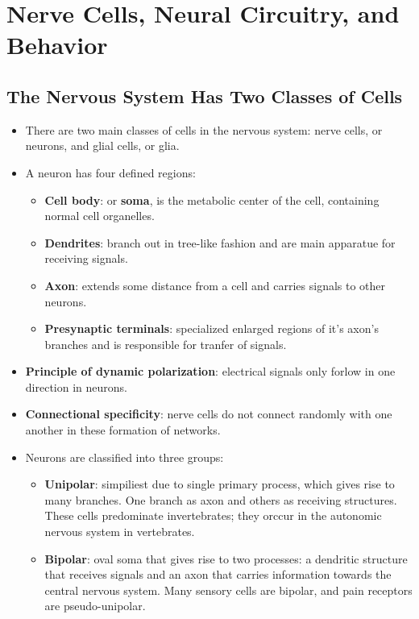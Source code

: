 \documentclass[12pt,a4paper]{article}
\begin{document}
\clearpage
\section{Nerve Cells, Neural Circuitry, and Behavior}
\subsection{The Nervous System Has Two Classes of Cells}
\begin{itemize}
    \item There are two main classes of cells in the nervous system: nerve cells, or neurons, and glial cells, or glia.
    \item A neuron has four defined regions:
        \begin{itemize}
            \item \textbf{Cell body}: or \textbf{soma}, is the metabolic center of the cell, containing normal cell organelles.
            \item \textbf{Dendrites}: branch out in tree-like fashion and are main apparatue for receiving signals.
            \item \textbf{Axon}: extends some distance from a cell and carries signals to other neurons.
            \item \textbf{Presynaptic terminals}: specialized enlarged regions of it's axon's branches and is responsible for tranfer of signals.
        \end{itemize}
    \item \textbf{Principle of dynamic polarization}: electrical signals only forlow in one direction in neurons.
    \item \textbf{Connectional specificity}: nerve cells do not connect randomly with one another in these formation of networks.
    \item Neurons are classified into three groups:
        \begin{itemize}
            \item \textbf{Unipolar}: simpiliest due to single primary process, which gives rise to many branches. One branch as axon and others as receiving structures. These cells predominate invertebrates; they orccur in the autonomic nervous system in vertebrates. 
            \item \textbf{Bipolar}: oval soma that gives rise to two processes: a dendritic structure that receives signals and an axon that carries information towards the central nervous system. Many sensory cells are bipolar, and pain receptors are pseudo-unipolar. 

\end{itemize}
\end{itemize}
\end{document}
